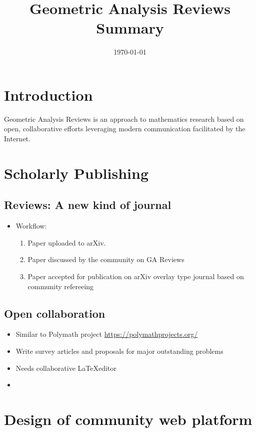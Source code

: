 \documentclass{amsart}
\title[GA Rev Summary]
 {Geometric Analysis Reviews Summary}
\date{\today}
\begin{document}
\maketitle

\section{Introduction}
\label{sec:intro}

Geometric Analysis Reviews is an approach to mathematics research based on open, collaborative efforts leveraging modern communication facilitated by the Internet.

\section{Scholarly Publishing}
\label{sec:publishing}

\subsection{Reviews: A new kind of journal}
\label{subsec:publishing_reviews}

\begin{itemize}
\item Workflow:
\begin{enumerate}
\item Paper uploaded to arXiv.
\item Paper discussed  by the community on GA Reviews
\item Paper accepted for publication on arXiv overlay type journal based on community refereeing
\end{enumerate}
\end{itemize}

\subsection{Open collaboration}
\label{subsec:publishing_collaboration}


\begin{itemize}
\item Similar to Polymath project \url{https://polymathprojects.org/}
\item Write survey articles and proposals for major outstanding problems
\item Needs collaborative \LaTeX editor
\item 
\end{itemize}

\section{Design of community web platform}
\label{sec:webdesign}
\end{document}

